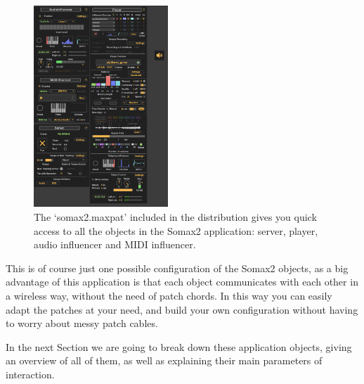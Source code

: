 \begin{figure}[H]
    \centering        
 	\includegraphics[width=0.45\textwidth]{img/somax2-7.png}
    \caption{The `somax2.maxpat' included in the distribution gives you quick access to all the objects in the Somax2 application: server, player, audio influencer and MIDI influencer.}
    \label{fig:somax2_ui_concepts}
\end{figure}

This is of course just one possible configuration of the Somax2 objects, as a big advantage of this application is that each object communicates with each other in a wireless way, without the need of patch chords. In this way you can easily adapt the patches at your need, and build your own configuration without having to worry about messy patch cables.

In the next Section we are going to break down these application objects, giving an overview of all of them, as well as explaining their main parameters of interaction.

